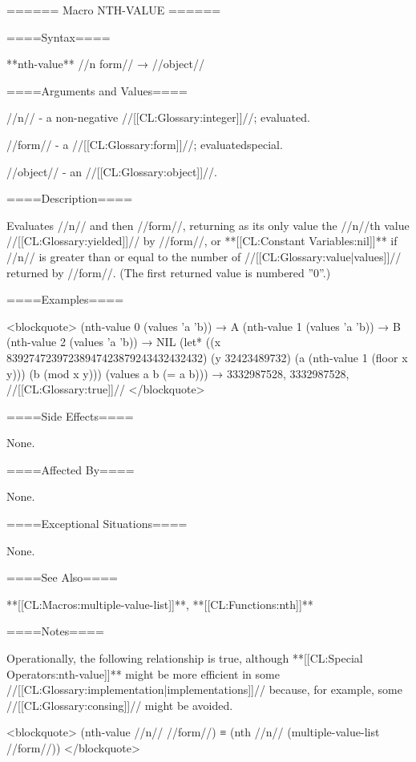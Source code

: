 ====== Macro NTH-VALUE ======

====Syntax====

**nth-value** //n form// → //object//

====Arguments and Values====

//n// - a non-negative //[[CL:Glossary:integer]]//; evaluated.

//form// - a //[[CL:Glossary:form]]//; evaluatedspecial.

//object// - an //[[CL:Glossary:object]]//.

====Description====

Evaluates //n// and then //form//, returning as its only value the //n//th value //[[CL:Glossary:yielded]]// by //form//, or **[[CL:Constant Variables:nil]]** if //n// is greater than or equal to the number of //[[CL:Glossary:value|values]]// returned by //form//. (The first returned value is numbered ''0''.)

====Examples====

<blockquote> (nth-value 0 (values 'a 'b)) → A (nth-value 1 (values 'a 'b)) → B (nth-value 2 (values 'a 'b)) → NIL (let* ((x 83927472397238947423879243432432432) (y 32423489732) (a (nth-value 1 (floor x y))) (b (mod x y))) (values a b (= a b))) → 3332987528, 3332987528, //[[CL:Glossary:true]]// </blockquote>

====Side Effects====

None.

====Affected By====

None.

====Exceptional Situations====

None.

====See Also====

**[[CL:Macros:multiple-value-list]]**, **[[CL:Functions:nth]]**

====Notes====

Operationally, the following relationship is true, although **[[CL:Special Operators:nth-value]]** might be more efficient in some //[[CL:Glossary:implementation|implementations]]// because, for example, some //[[CL:Glossary:consing]]// might be avoided.

<blockquote> (nth-value //n// //form//) ≡ (nth //n// (multiple-value-list //form//)) </blockquote>

